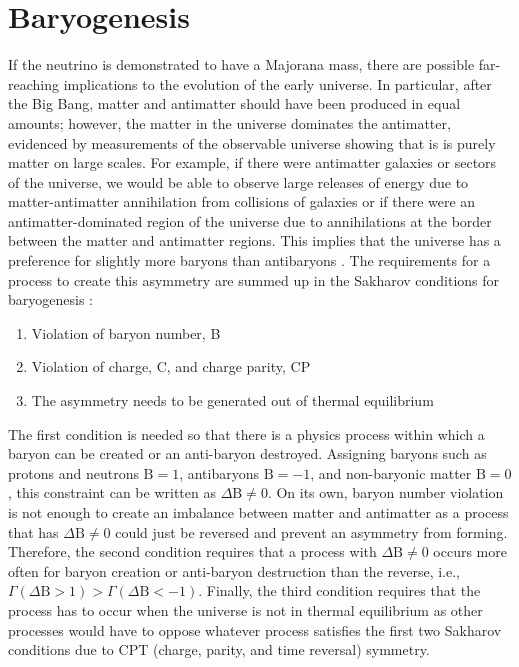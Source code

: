 \section{Baryogenesis}
If the neutrino is demonstrated to have a Majorana mass, there are possible far-reaching implications to the evolution of the early universe.
In particular, after the Big Bang, matter and antimatter should have been produced in equal amounts; however, the matter in the universe dominates the antimatter, evidenced by measurements of the observable universe showing that is is purely matter on large scales.
For example, if there were antimatter galaxies or sectors of the universe, we would be able to observe large releases of energy due to matter-antimatter annihilation from collisions of galaxies or if there were an antimatter-dominated region of the universe due to annihilations at the border between the matter and antimatter regions.
This implies that the universe has a preference for slightly more baryons than antibaryons \cite{Canetti:2012zc}.
The requirements for a process to create this asymmetry are summed up in the Sakharov conditions for baryogenesis \cite{Sakharov:1967dj}:
\begin{enumerate}
\item Violation of baryon number, B
\item Violation of charge, C, and charge parity, CP
\item The asymmetry needs to be generated out of thermal equilibrium
\end{enumerate}
The first condition is needed so that there is a physics process within which a baryon can be created or an anti-baryon destroyed.
Assigning baryons such as protons and neutrons $\textrm{B}=1$, antibaryons $\textrm{B}=-1$, and non-baryonic matter $\textrm{B}=0$, this constraint can be written as $\Delta \textrm{B}\neq0$.
On its own, baryon number violation is not enough to create an imbalance between matter and antimatter as a process that has $\Delta\textrm{B}\neq0$ could just be reversed and prevent an asymmetry from forming.
Therefore, the second condition requires that a process with $\Delta\textrm{B}\neq0$ occurs more often for baryon creation or anti-baryon destruction than the reverse, i.e., $\Gamma(\Delta \textrm{B}>1) > \Gamma(\Delta \textrm{B}<-1)$.
Finally, the third condition requires that the process has to occur when the universe is not in thermal equilibrium as other processes would have to oppose whatever process satisfies the first two Sakharov conditions due to CPT (charge, parity, and time reversal) symmetry.

